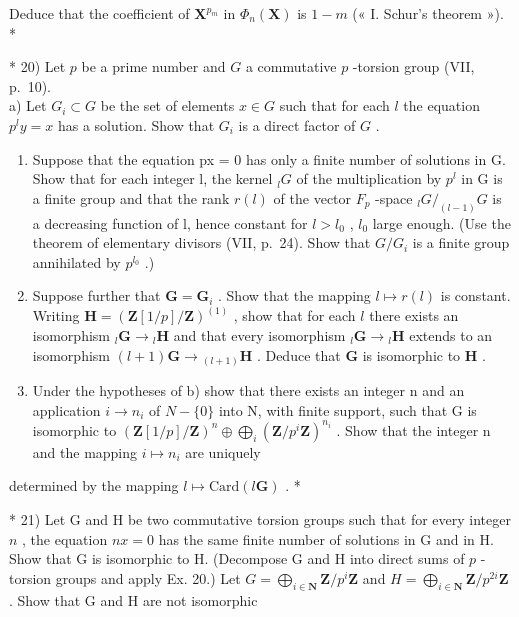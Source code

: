 Deduce that the coefficient of \(\mathbf{X}^{p_m}\) in \(\Phi_n(\mathbf{X})\) is \(1 - m\) (« I. Schur's theorem »). *

* 20) Let \(p\) be a prime number and \(G\) a commutative \(p\) -torsion group (VII, p.~10).\\
a) Let \(G_i \subset G\) be the set of elements \(x \in G\) such that for each \(l\) the equation \(p^{l} y = x\) has a solution. Show that \(G_i\) is a direct factor of \(G\) .

\begin{enumerate}
\def\labelenumi{\alph{enumi})}
\setcounter{enumi}{1}
\item
  Suppose that the equation px = 0 has only a finite number of solutions in G. Show that for each integer l, the kernel \(_{l}G\) of the multiplication by \(p^{l}\) in G is a finite group and that the rank \(r(l)\) of the vector \(F_{p}\) -space \(_{l}G/_{(l-1)}G\) is a decreasing function of l, hence constant for \(l > l_{0}\) , \(l_{0}\) large enough. (Use the theorem of elementary divisors (VII, p.~24). Show that \(G/G_{i}\) is a finite group annihilated by \(p^{l_{0}}\) .)
\item
  Suppose further that \(\mathbf{G} = \mathbf{G}_i\) . Show that the mapping \(l \mapsto r(l)\) is constant. Writing \(\mathbf{H} = (\mathbf{Z}[1/p]/\mathbf{Z})^{(1)}\) , show that for each \(l\) there exists an isomorphism \(_l\mathbf{G} \to {}_l\mathbf{H}\) and that every isomorphism \(_l\mathbf{G} \to {}_l\mathbf{H}\) extends to an isomorphism \((l+1)\mathbf{G} \to {}_{(l+1)}\mathbf{H}\) . Deduce that \(\mathbf{G}\) is isomorphic to \(\mathbf{H}\) .
\item
  Under the hypotheses of b) show that there exists an integer n and an application \(i \to n_i\) of \(N - \{0\}\) into N, with finite support, such that G is isomorphic to \((\mathbf{Z}[1/p]/\mathbf{Z})^n \oplus \bigoplus_{i} (\mathbf{Z}/p^i \mathbf{Z})^{n_i}\) . Show that the integer n and the mapping \(i \mapsto n_i\) are uniquely
\end{enumerate}

determined by the mapping \(l \mapsto \text{Card}(l\mathbf{G})\) . *

* 21) Let G and H be two commutative torsion groups such that for every integer \(n\) , the equation \(nx = 0\) has the same finite number of solutions in G and in H. Show that G is isomorphic to H. (Decompose G and H into direct sums of \(p\) -torsion groups and apply Ex. 20.) Let \(G = \bigoplus_{i \in \mathbf{N}} \mathbf{Z} / p^i\mathbf{Z}\) and \(H = \bigoplus_{i \in \mathbf{N}} \mathbf{Z} / p^{2i}\mathbf{Z}\) . Show that G and H are not isomorphic

